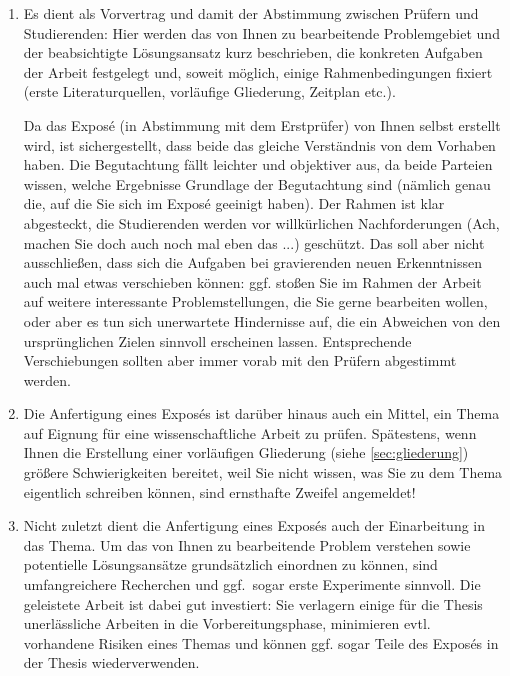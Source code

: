 \documentclass[11pt]{scrartcl}
\newcommand{\qto}[1]{\glqq #1\grqq}				%
\newcommand{\ggf}{ggf.\xspace}
\newcommand{\evtl}{evtl.\xspace}
\begin{document}
\begin{enumerate}
\item Es dient als \qto{Vorvertrag} und damit der Abstimmung zwischen Prüfern und Studierenden: Hier werden das von Ihnen zu bearbeitende Problemgebiet und der beabsichtigte Lösungsansatz kurz beschrieben, die konkreten Aufgaben der Arbeit festgelegt und, soweit möglich, einige Rahmenbedingungen fixiert (erste Literaturquellen, vorläufige Gliederung, Zeitplan etc.).

Da das Exposé (in Abstimmung mit dem Erstprüfer) von Ihnen selbst erstellt wird, ist sichergestellt, dass beide das gleiche Verständnis von dem Vorhaben haben. Die Begutachtung fällt leichter und objektiver aus, da beide Parteien wissen, welche Ergebnisse Grundlage der Begutachtung sind (nämlich genau die, auf die Sie sich im Exposé geeinigt haben). Der Rahmen ist klar abgesteckt, die Studierenden werden vor willkürlichen Nachforderungen (\qto{Ach, machen Sie doch auch noch mal eben das ...}) geschützt. Das soll aber nicht ausschließen, dass sich die Aufgaben bei gravierenden neuen Erkenntnissen auch mal etwas verschieben können: \ggf stoßen Sie im Rahmen der Arbeit auf weitere interessante Problemstellungen, die Sie gerne bearbeiten wollen, oder aber es tun sich unerwartete Hindernisse auf, die ein Abweichen von den ursprünglichen Zielen sinnvoll erscheinen lassen. Entsprechende Verschiebungen sollten aber immer vorab mit den Prüfern abgestimmt werden.

\item Die Anfertigung eines Exposés ist darüber hinaus auch ein Mittel, ein Thema auf Eignung für eine wissenschaftliche Arbeit zu prüfen. Spätestens, wenn Ihnen die Erstellung einer vorläufigen Gliederung (siehe \cref{sec:gliederung}) größere Schwierigkeiten bereitet, weil Sie nicht wissen, was Sie zu dem Thema eigentlich schreiben können, sind ernsthafte Zweifel angemeldet!
\item Nicht zuletzt dient die Anfertigung eines Exposés auch der Einarbeitung in das Thema. Um das von Ihnen zu bearbeitende Problem verstehen sowie potentielle Lösungsansätze grundsätzlich einordnen zu können, sind umfangreichere Recherchen und \ggf\ sogar erste Experimente sinnvoll. Die geleistete Arbeit ist dabei gut investiert: Sie verlagern einige für die Thesis unerlässliche Arbeiten in die Vorbereitungsphase, minimieren \evtl vorhandene Risiken eines Themas und können \ggf sogar Teile des Exposés in der Thesis wiederverwenden.
\end{enumerate}
  
\end{document}
